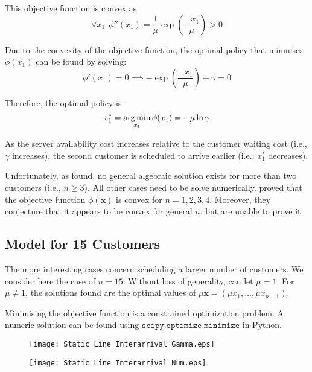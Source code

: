 This objective function is convex as
\begin{equation}
	\forall x_{1} \ \ \phi'' (x_{1}) = \frac{1}{\mu} \exp \left( \frac{- x_{1}}{\mu} \right) > 0
\end{equation}

Due to the convexity of the objective function, the optimal policy that minmises $\phi (x_{1})$ can be found by solving:
\begin{equation}
	\phi' (x_{1}) = 0 \implies - \exp \left( \frac{- x_{1}}{\mu} \right) + \gamma = 0
\end{equation}

Therefore, the optimal policy is:
\begin{equation}
	x_{1}^{*} = \operatorname*{arg\,min}_{x_{1}} \phi (x_{1}) = - \mu \ln \gamma
\end{equation}

As the server availability cost increases relative to the customer waiting cost (i.e., $\gamma$ increases), the second customer is scheduled to arrive earlier (i.e., $x_{1}^{*}$ decreases).

Unfortunately, as \citet{Pegden} found, no general algebraic solution exists for more than two customers (i.e., $n \geq 3$). All other cases need to be solve numerically. \citet{Pegden} proved that the objective function $\phi (\mathbf{x})$ is convex for $n = 1, 2, 3, 4$. Moreover, they conjecture that it appears to be convex for general $n$, but are unable to prove it.

\subsection{Model for 15 Customers}
The more interesting cases concern scheduling a larger number of customers. We consider here the case of $n = 15$. Without loss of generality, can let $\mu = 1$. For $\mu \neq 1$, the solutions found are the optimal values of $\mu \mathbf{x} = (\mu x_{1}, \ldots, \mu x_{n - 1})$.

Minimising the objective function is a constrained optimization problem. A numeric solution can be found using $\texttt{scipy.optimize.minimize}$ in Python.

\begin{figure}[htb]
	\centering
	\texttt{[image: Static\_Line\_Interarrival\_Gamma.eps]}
	\caption{}
\end{figure}

\begin{figure}[htb]
	\centering
	\texttt{[image: Static\_Line\_Interarrival\_Num.eps]}
	\caption{}
\end{figure}










































